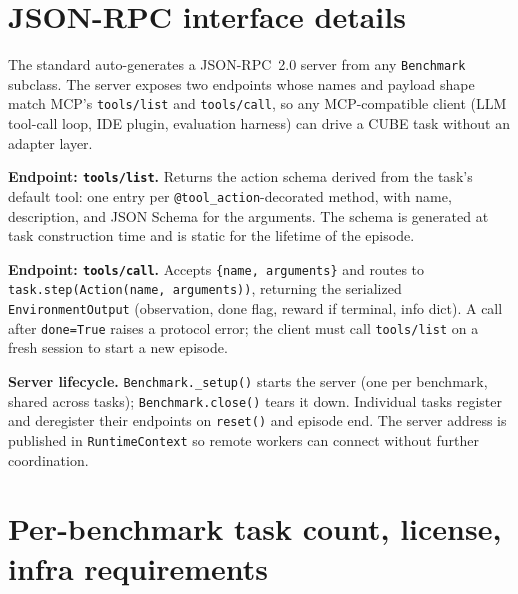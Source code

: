 \documentclass{article}
\newcommand{\mypar}[1]{\par\noindent\textbf{#1}\enspace}
\begin{document}
\section{JSON-RPC interface details}
\label{apdx:json-rpc-protocol}

The standard auto-generates a JSON-RPC~2.0 server from any \texttt{Benchmark} subclass.
The server exposes two endpoints whose names and payload shape match MCP's \texttt{tools/list} and \texttt{tools/call}, so any MCP-compatible client (LLM tool-call loop, IDE plugin, evaluation harness) can drive a CUBE task without an adapter layer.

\mypar{Endpoint: \texttt{tools/list}.}
Returns the action schema derived from the task's default tool: one entry per \texttt{@tool\_action}-decorated method, with name, description, and JSON Schema for the arguments. The schema is generated at task construction time and is static for the lifetime of the episode.

\mypar{Endpoint: \texttt{tools/call}.}
Accepts \texttt{\{name, arguments\}} and routes to \texttt{task.step(Action(name, arguments))}, returning the serialized \texttt{EnvironmentOutput} (observation, done flag, reward if terminal, info dict). A call after \texttt{done=True} raises a protocol error; the client must call \texttt{tools/list} on a fresh session to start a new episode.

\mypar{Server lifecycle.}
\texttt{Benchmark.\_setup()} starts the server (one per benchmark, shared across tasks); \texttt{Benchmark.close()} tears it down. Individual tasks register and deregister their endpoints on \texttt{reset()} and episode end. The server address is published in \texttt{RuntimeContext} so remote workers can connect without further coordination.


\section{Per-benchmark task count, license, infra requirements}
\label{apdx:bench-details}
\end{document}
